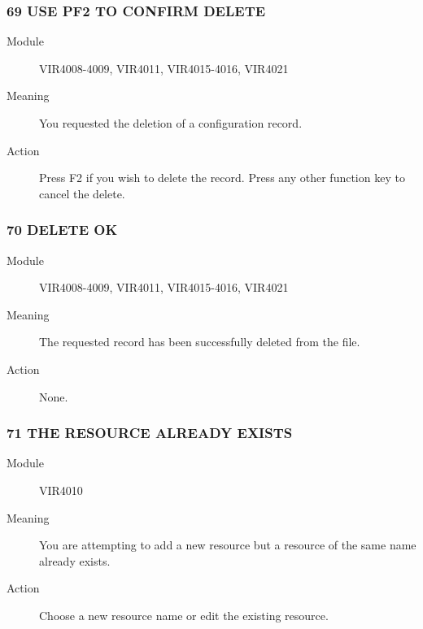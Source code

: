 \documentclass[letterpaper,10pt,english]{sphinxmanual}
\begin{document}
\subsubsection{69 USE PF2 TO CONFIRM DELETE}
\label{\detokenize{messages:use-pf2-to-confirm-delete}}\begin{description}
\item[{Module}] \leavevmode
VIR4008-4009, VIR4011, VIR4015-4016, VIR4021

\item[{Meaning}] \leavevmode
You requested the deletion of a configuration record.

\item[{Action}] \leavevmode
Press F2 if you wish to delete the record. Press any other function key to cancel the delete.

\end{description}


\subsubsection{70 DELETE OK}
\label{\detokenize{messages:id3}}\begin{description}
\item[{Module}] \leavevmode
VIR4008-4009, VIR4011, VIR4015-4016, VIR4021

\item[{Meaning}] \leavevmode
The requested record has been successfully deleted from the file.

\item[{Action}] \leavevmode
None.

\end{description}


\subsubsection{71 THE RESOURCE ALREADY EXISTS}
\label{\detokenize{messages:the-resource-already-exists}}\begin{description}
\item[{Module}] \leavevmode
VIR4010

\item[{Meaning}] \leavevmode
You are attempting to add a new resource but a resource of the same name already exists.

\item[{Action}] \leavevmode
Choose a new resource name or edit the existing resource.

\end{description}
\end{document}
